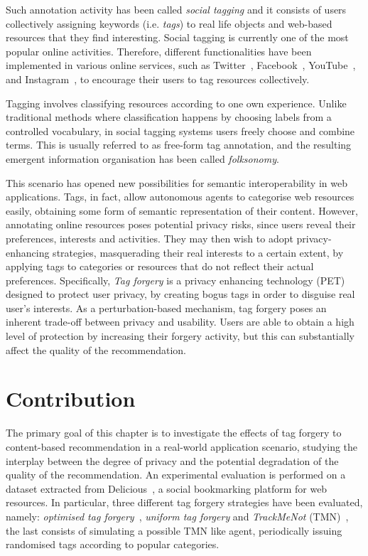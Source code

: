 Such annotation activity has been called \emph{social tagging} and it consists of users collectively assigning keywords (i.e. \emph{tags}) to real life objects and web-based resources that they find interesting. Social tagging is currently one of the most popular online activities. Therefore, different functionalities have been implemented in various online services, such as Twitter~\cite{twitter}, Facebook~\cite{facebook}, YouTube~\cite{youtube}, and Instagram~\cite{instagram}, to encourage their users to tag resources collectively.

Tagging involves classifying resources according to one own experience. Unlike traditional methods where classification happens by choosing labels from a controlled vocabulary, in social tagging systems users freely choose and combine terms. This is usually referred to as free-form tag annotation, and the resulting emergent information organisation has been called \emph{folksonomy}.

This scenario has opened new possibilities for semantic interoperability in web applications. Tags, in fact, allow autonomous agents to categorise web resources easily, obtaining some form of semantic representation of their content.
However, annotating online resources poses potential privacy risks, since users reveal their preferences, interests and activities. They may then wish to adopt privacy-enhancing strategies, masquerading their real interests to a certain extent, by applying tags to categories or resources that do not reflect their actual preferences. Specifically, \emph{Tag forgery} is a privacy enhancing technology (PET) designed to protect user privacy, by creating bogus tags in order to disguise real user's interests. As a perturbation-based mechanism, tag forgery poses an inherent trade-off between privacy and usability. Users are able to obtain a high level of protection by increasing their forgery activity, but this can substantially affect the quality of the recommendation.

\section{Contribution}

The primary goal of this chapter is to investigate the effects of tag forgery to content-based recommendation in a real-world application scenario, studying the interplay between the degree of privacy and the potential degradation of the quality of the recommendation. An experimental evaluation is performed on a dataset extracted from Delicious~\cite{delicious}, a social bookmarking platform for web resources. In particular, three different tag forgery strategies have been evaluated, namely: \emph{optimised tag forgery}~\cite{Rebollo10IT}, \emph{uniform tag forgery} and \emph{TrackMeNot} (TMN)~\cite{Howe06B}, the last consists of simulating a possible TMN like agent, periodically issuing randomised tags according to popular categories.

